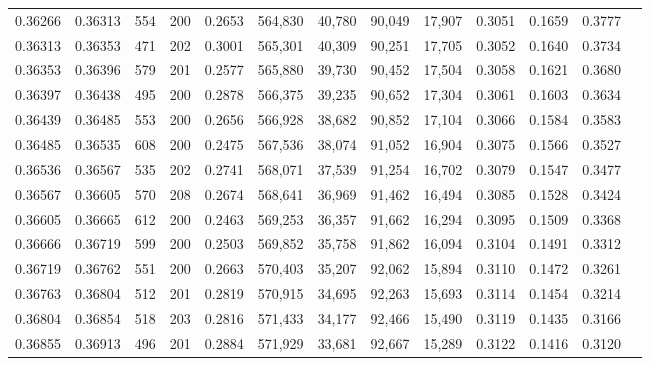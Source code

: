 \begin{tabular}{rrrrrrrrrrrrr}
0.36266 & 0.36313 &   554 & 200 &                                     0.2653 & 564,830 &  40,780 &  90,049 &  17,907 & 0.3051 & 0.1659 & 0.3777 \\
0.36313 & 0.36353 &   471 & 202 &                                     0.3001 & 565,301 &  40,309 &  90,251 &  17,705 & 0.3052 & 0.1640 & 0.3734 \\
0.36353 & 0.36396 &   579 & 201 &                                     0.2577 & 565,880 &  39,730 &  90,452 &  17,504 & 0.3058 & 0.1621 & 0.3680 \\
0.36397 & 0.36438 &   495 & 200 &                                     0.2878 & 566,375 &  39,235 &  90,652 &  17,304 & 0.3061 & 0.1603 & 0.3634 \\
0.36439 & 0.36485 &   553 & 200 &                                     0.2656 & 566,928 &  38,682 &  90,852 &  17,104 & 0.3066 & 0.1584 & 0.3583 \\
0.36485 & 0.36535 &   608 & 200 &                                     0.2475 & 567,536 &  38,074 &  91,052 &  16,904 & 0.3075 & 0.1566 & 0.3527 \\
0.36536 & 0.36567 &   535 & 202 &                                     0.2741 & 568,071 &  37,539 &  91,254 &  16,702 & 0.3079 & 0.1547 & 0.3477 \\
0.36567 & 0.36605 &   570 & 208 &                                     0.2674 & 568,641 &  36,969 &  91,462 &  16,494 & 0.3085 & 0.1528 & 0.3424 \\
0.36605 & 0.36665 &   612 & 200 &                                     0.2463 & 569,253 &  36,357 &  91,662 &  16,294 & 0.3095 & 0.1509 & 0.3368 \\
0.36666 & 0.36719 &   599 & 200 &                                     0.2503 & 569,852 &  35,758 &  91,862 &  16,094 & 0.3104 & 0.1491 & 0.3312 \\
0.36719 & 0.36762 &   551 & 200 &                                     0.2663 & 570,403 &  35,207 &  92,062 &  15,894 & 0.3110 & 0.1472 & 0.3261 \\
0.36763 & 0.36804 &   512 & 201 &                                     0.2819 & 570,915 &  34,695 &  92,263 &  15,693 & 0.3114 & 0.1454 & 0.3214 \\
0.36804 & 0.36854 &   518 & 203 &                                     0.2816 & 571,433 &  34,177 &  92,466 &  15,490 & 0.3119 & 0.1435 & 0.3166 \\
0.36855 & 0.36913 &   496 & 201 &                                     0.2884 & 571,929 &  33,681 &  92,667 &  15,289 & 0.3122 & 0.1416 & 0.3120 \\

\end{tabular}
